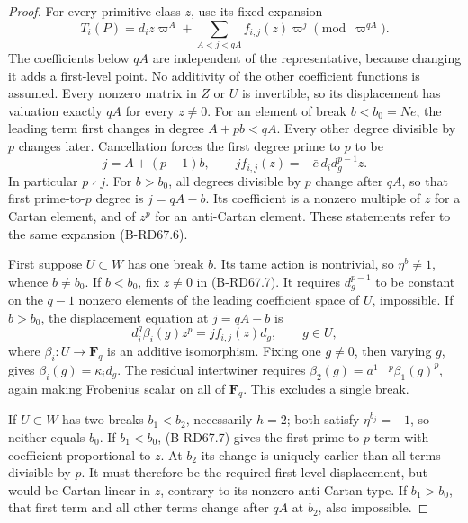 \begin{proof}
For every primitive class \(z\), use its fixed expansion
\[
 T_i(P)=d_i z\varpi^A+
       \sum_{A<j<qA}f_{i,j}(z)\varpi^j\pmod{\varpi^{qA}}.
 \tag{B-RD67.6}
\]
The coefficients below \(qA\) are independent of the representative,
because changing it adds a first-level point. No additivity
of the other coefficient functions is assumed. Every nonzero
matrix in \(Z\) or \(U\) is invertible, so its displacement
has valuation exactly \(qA\) for every \(z\ne0\).
For an element of break \(b<b_0=Ne\), the leading term first
changes in degree \(A+pb<qA\). Every other degree divisible
by \(p\) changes later. Cancellation forces the first degree
prime to \(p\) to be
\[
 j=A+(p-1)b,\qquad
 j f_{i,j}(z)=-\bar e\,d_i d_g^{p-1}z .
 \tag{B-RD67.7}
\]
In particular \(p\nmid j\). For \(b>b_0\), all degrees divisible
by \(p\) change after \(qA\), so that first prime-to-\(p\)
degree is \(j=qA-b\). Its coefficient is a nonzero multiple
of \(z\) for a Cartan element, and of \(z^p\) for an anti-Cartan
element. These statements refer to the same expansion (B-RD67.6).

First suppose \(U\subset W\) has one break \(b\). Its tame action
is nontrivial, so \(\eta^b\ne1\), whence \(b\ne b_0\).
If \(b<b_0\), fix \(z\ne0\) in (B-RD67.7). It requires
\(d_g^{p-1}\) to be constant on the \(q-1\) nonzero elements
of the leading coefficient space of \(U\), impossible.
If \(b>b_0\), the displacement equation at \(j=qA-b\) is
\[
 d_i^q\beta_i(g)z^p=j f_{i,j}(z)d_g,\qquad g\in U,
\]
where \(\beta_i:U\to\mathbf F_q\) is an additive isomorphism.
Fixing one \(g\ne0\), then varying \(g\), gives
\(\beta_i(g)=\kappa_i d_g\). The residual intertwiner requires
\(\beta_2(g)=a^{1-p}\beta_1(g)^p\), again making Frobenius
scalar on all of \(\mathbf F_q\). This excludes a single break.

If \(U\subset W\) has two breaks \(b_1<b_2\), necessarily \(h=2\);
both satisfy \(\eta^{b_j}=-1\), so neither equals \(b_0\).
If \(b_1<b_0\), (B-RD67.7) gives the first prime-to-\(p\)
term with coefficient proportional to \(z\). At \(b_2\) its
change is uniquely earlier than all terms divisible by \(p\).
It must therefore be the required first-level displacement,
but would be Cartan-linear in \(z\), contrary to its nonzero
anti-Cartan type. If \(b_1>b_0\), that first term and all
other terms change after \(qA\) at \(b_2\), also impossible.


\end{proof}
